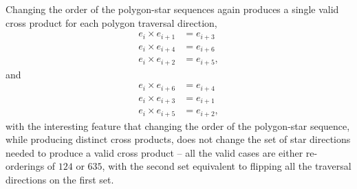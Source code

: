 \documentclass[11pt]{article}
\newcommand{\bv}[1][]{e_{#1}}
\begin{document}
Changing the order of the polygon-star sequences
 again produces a single valid cross product for each polygon traversal direction,
  \begin{subequations}
\begin{align}
\bv[i]\times\bv[i+1] &= \bv[i+3] \\
\bv[i]\times\bv[i+4] &= \bv[i+6] \\
\bv[i]\times\bv[i+2] &= \bv[i+5],
\end{align}
\end{subequations}
and
\begin{subequations}
\begin{align}
\bv[i]\times\bv[i+6] &= \bv[i+4] \\
\bv[i]\times\bv[i+3] &= \bv[i+1] \\
\bv[i]\times\bv[i+5] &= \bv[i+2],
\end{align}
\end{subequations}
 with the interesting feature that changing the order of the polygon-star sequence, while producing distinct cross products, does not change the set of star directions needed to produce a valid cross product -- all the valid cases are either re-orderings of $124$ or $635$, with the second set equivalent to flipping all the traversal directions on the first set.
\end{document}
